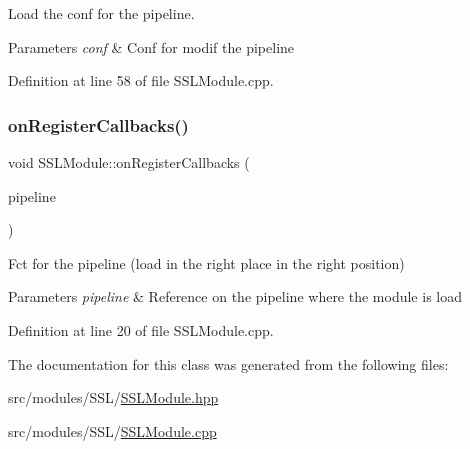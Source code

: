 Load the conf for the pipeline. 


\begin{DoxyParams}{Parameters}
{\em conf} & Conf for modif the pipeline \\
\hline
\end{DoxyParams}


Definition at line 58 of file S\+S\+L\+Module.\+cpp.

\mbox{\label{class_s_s_l_module_ad2bcf5908355b434e45ea156a49f7d39}} 
\subsubsection{\texorpdfstring{on\+Register\+Callbacks()}{onRegisterCallbacks()}}
{\footnotesize\ttfamily void S\+S\+L\+Module\+::on\+Register\+Callbacks (\begin{DoxyParamCaption}\item[{o\+Z\+::\+Pipeline \&}]{pipeline }\end{DoxyParamCaption})\hspace{0.3cm}{\ttfamily [virtual]}}



Fct for the pipeline (load in the right place in the right position) 


\begin{DoxyParams}{Parameters}
{\em pipeline} & Reference on the pipeline where the module is load \\
\hline
\end{DoxyParams}


Definition at line 20 of file S\+S\+L\+Module.\+cpp.



The documentation for this class was generated from the following files\+:\begin{DoxyCompactItemize}
\item 
src/modules/\+S\+S\+L/\hyperlink{_s_s_l_module_8hpp}{S\+S\+L\+Module.\+hpp}\item 
src/modules/\+S\+S\+L/\hyperlink{_s_s_l_module_8cpp}{S\+S\+L\+Module.\+cpp}\end{DoxyCompactItemize}
